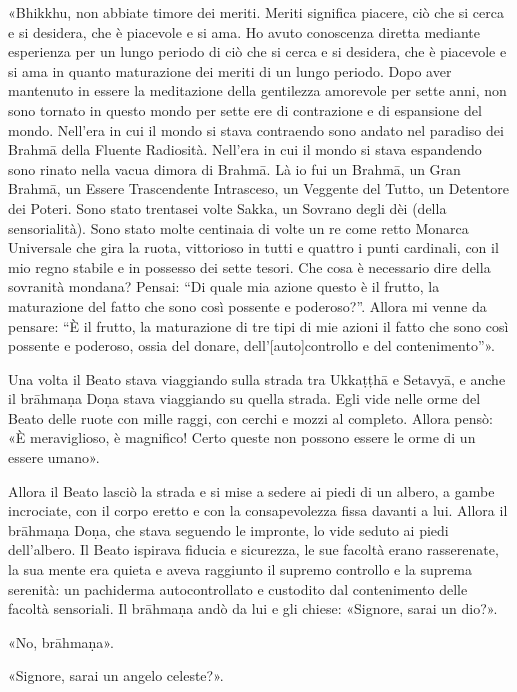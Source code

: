 «Bhikkhu, non abbiate timore dei meriti. Meriti significa piacere, ciò
che si cerca e si desidera, che è piacevole e si ama. Ho avuto
conoscenza diretta mediante esperienza per un lungo periodo di ciò che
si cerca e si desidera, che è piacevole e si ama in quanto maturazione
dei meriti di un lungo periodo. Dopo aver mantenuto in essere la
meditazione della gentilezza amorevole per sette anni, non sono tornato
in questo mondo per sette ere di contrazione e di espansione del mondo.
Nell’era in cui il mondo si stava contraendo sono andato nel paradiso
dei Brahmā della Fluente Radiosità. Nell’era in cui il mondo si stava
espandendo sono rinato nella vacua dimora di Brahmā. Là io fui un
Brahmā, un Gran Brahmā, un Essere Trascendente Intrasceso, un Veggente
del Tutto, un Detentore dei Poteri. Sono stato trentasei volte Sakka, un
Sovrano degli dèi (della sensorialità). Sono stato molte centinaia di
volte un re come retto Monarca Universale che gira la ruota, vittorioso
in tutti e quattro i punti cardinali, con il mio regno stabile e in
possesso dei sette tesori. Che cosa è necessario dire della sovranità
mondana? Pensai: “Di quale mia azione questo è il frutto, la maturazione
del fatto che sono così possente e poderoso?”. Allora mi venne da
pensare: “È il frutto, la maturazione di tre tipi di mie azioni il fatto
che sono così possente e poderoso, ossia del donare,
dell’[auto]controllo e del contenimento”».




Una volta il Beato stava viaggiando sulla strada tra Ukkaṭṭhā e Setavyā,
e anche il brāhmaṇa Doṇa stava viaggiando su quella strada. Egli vide
nelle orme del Beato delle ruote con mille raggi, con cerchi e mozzi al
completo. Allora pensò: «È meraviglioso, è magnifico! Certo queste non
possono essere le orme di un essere umano».


Allora il Beato lasciò la strada e si mise a sedere ai piedi di un
albero, a gambe incrociate, con il corpo eretto e con la consapevolezza
fissa davanti a lui. Allora il brāhmaṇa Doṇa, che stava seguendo le
impronte, lo vide seduto ai piedi dell’albero. Il Beato ispirava fiducia
e sicurezza, le sue facoltà erano rasserenate, la sua mente era quieta e
aveva raggiunto il supremo controllo e la suprema serenità: un
pachiderma autocontrollato e custodito dal contenimento delle facoltà
sensoriali. Il brāhmaṇa andò da lui e gli chiese: «Signore, sarai un
dio?».


«No, brāhmaṇa».


«Signore, sarai un angelo celeste?».



